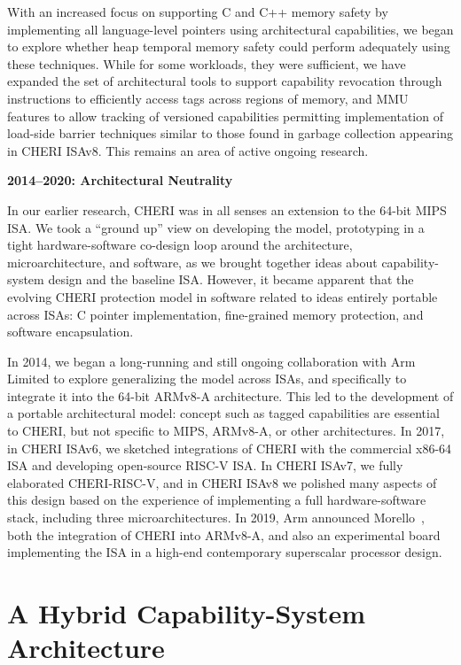 With an increased focus on supporting C and C++ memory safety by implementing
all language-level pointers using architectural capabilities, we began to
explore whether heap temporal memory safety could perform adequately using
these techniques.
While for some workloads, they were sufficient, we have expanded the set of
architectural tools to support capability revocation through instructions to
efficiently access tags across regions of memory, and MMU features to allow
tracking of versioned capabilities permitting implementation of load-side
barrier techniques similar to those found in garbage collection appearing in
CHERI ISAv8.
This remains an area of active ongoing research.

\medskip
\noindent
\textbf{2014--2020: Architectural Neutrality}

In our earlier research, CHERI was in all senses an extension to the 64-bit
MIPS ISA.
We took a ``ground up'' view on developing the model, prototyping in a tight
hardware-software co-design loop around the architecture, microarchitecture,
and software, as we brought together ideas about capability-system design and
the baseline ISA.
However, it became apparent that the evolving CHERI protection model in
software related to ideas entirely portable across ISAs: C pointer
implementation, fine-grained memory protection, and software encapsulation.

In 2014, we began a long-running and still ongoing collaboration with Arm
Limited to explore generalizing the model across ISAs, and specifically to
integrate it into the 64-bit ARMv8-A architecture.
This led to the development of a portable architectural model: concept such as
tagged capabilities are essential to CHERI, but not specific to MIPS, ARMv8-A,
or other architectures.
In 2017, in CHERI ISAv6, we sketched integrations of CHERI with the commercial
x86-64 ISA and developing open-source RISC-V ISA.
In CHERI ISAv7, we fully elaborated CHERI-RISC-V, and in CHERI ISAv8 we
polished many aspects of this design based on the experience of implementing a
full hardware-software stack, including three microarchitectures.
In 2019, Arm announced Morello~\cite{arm-morello}, both the integration of
CHERI into ARMv8-A, and also an experimental board implementing the ISA in a
high-end contemporary superscalar processor design.

\section{A Hybrid Capability-System Architecture}

